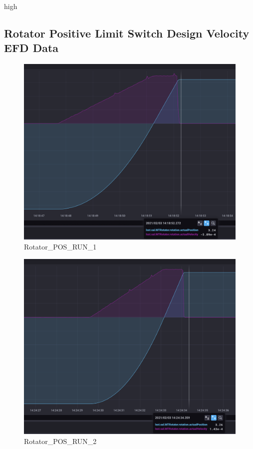 high\documentclass[SE,lsstdraft,authoryear,toc]{lsstdoc}
\begin{document}
\subsection{Rotator Positive Limit Switch Design Velocity EFD Data}
\begin{figure}[h!]
  \includegraphics[width=\linewidth]{media/Rotator_design_speed_pos_test1.png}
  \caption{Rotator\_POS\_RUN\_1}
  \label{fig:Rotator_POS_RUN_1}
\end{figure}
\begin{figure}[h!]
  \includegraphics[width=\linewidth]{media/Rotator_design_speed_pos_test2.png}
  \caption{Rotator\_POS\_RUN\_2}
  \label{fig:Rotator_POS_RUN_2}
\end{figure}
\end{document}
